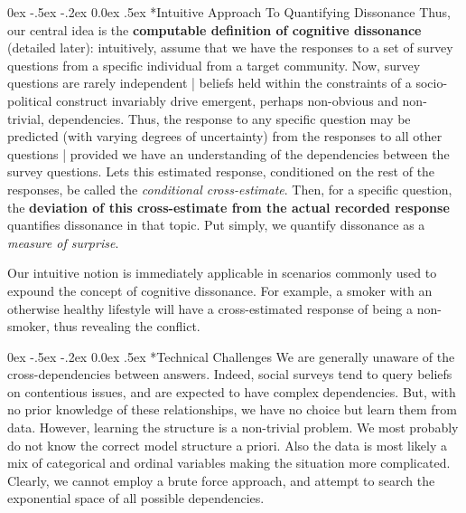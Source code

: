 \documentclass[onecolumn, compsoc,11pt]{IEEEtran}
\makeatletter
\renewcommand\subsubsection{\@startsection {section}{1}{\z@}%
                                   {0ex \@plus -.5ex \@minus -.2ex}%
                                   {0.0ex \@plus.5ex}%
                                   {\fontsize{10}{10}\selectfont\bfseries\sffamily\color{Red4}}}
\makeatother
\begin{document}
\subsubsection*{Intuitive Approach To Quantifying Dissonance} Thus, our central idea is the \textbf{computable definition of cognitive dissonance} (detailed later): intuitively, assume that we have  the responses to a set of survey questions from a specific individual from a target community. Now, survey questions are rarely independent | beliefs held within the constraints of a socio-political construct invariably drive emergent,  perhaps non-obvious and non-trivial, dependencies. Thus, the response to any specific question may be predicted (with varying degrees of uncertainty) from the responses to all other questions | provided we have an understanding of the dependencies between the survey questions. Lets this estimated response, conditioned on the rest of the responses, be called the  \textit{conditional cross-estimate}. Then, for a specific question, the \textbf{deviation of this cross-estimate from the actual recorded response}  quantifies dissonance in that topic. Put simply, we quantify dissonance as a \textit{measure of surprise}.

Our intuitive notion  is immediately applicable   in   scenarios commonly used to expound the concept of cognitive dissonance. For example, a smoker  with an otherwise  healthy lifestyle will have a cross-estimated response of being a non-smoker, thus revealing the conflict.

\subsubsection*{Technical Challenges} We are generally unaware of the cross-dependencies between answers. Indeed, social surveys tend to query beliefs on contentious issues, and are expected to  have complex dependencies. But, with no prior knowledge of these relationships, we have no choice but learn them from data. However, learning the structure is a non-trivial problem. We most probably  do not know the correct model structure a priori. Also the data is most likely a  mix of categorical and ordinal variables making the situation more complicated. Clearly, we cannot employ a brute force approach, and attempt to search the exponential space of all possible dependencies. 
\end{document}
